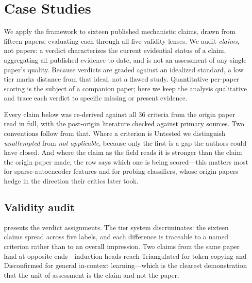\documentclass{article}
\begin{document}
\section{Case Studies}
\label{sec:case-studies}

We apply the framework to sixteen published mechanistic claims, drawn from fifteen papers, evaluating each through all five validity lenses. We audit \emph{claims}, not papers: a verdict characterizes the current evidential status of a claim, aggregating all published evidence to date, and is not an assessment of any single paper's quality. Because verdicts are graded against an idealized standard, a low tier marks distance from that ideal, not a flawed study. Quantitative per-paper scoring is the subject of a companion paper; here we keep the analysis qualitative and trace each verdict to specific missing or present evidence.

Every claim below was re-derived against all 36 criteria from the origin paper read in full, with the post-origin literature checked against primary sources. Two conventions follow from that. Where a criterion is Untested we distinguish \emph{unattempted} from \emph{not applicable}, because only the first is a gap the authors could have closed. And where the claim as the field reads it is stronger than the claim the origin paper made, the row says which one is being scored---this matters most for sparse-autoencoder features and for probing classifiers, whose origin papers hedge in the direction their critics later took.

\subsection{Validity audit}

 presents the verdict assignments. The tier system discriminates: the sixteen claims spread across five labels, and each difference is traceable to a named criterion rather than to an overall impression. Two claims from the same paper land at opposite ends---induction heads reach Triangulated for token copying and Disconfirmed for general in-context learning---which is the clearest demonstration that the unit of assessment is the claim and not the paper.
\end{document}
